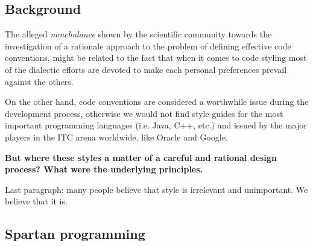 \subsection{Background}

% 

The alleged \emph{nonchalance} shown by the scientific community towards the
investigation of a rationale approach to the problem of defining effective code
conventions, might be related to the fact that when it comes to code styling
most of the dialectic efforts are devoted to make each personal preferences 
prevail against the others.



On the other hand, code conventions are considered a worthwhile issue during
the development process, otherwise we would not find style guides for the most important
programming languages (i.e. Java, C++, etc.) and issued by the major players in
the ITC arena worldwide, like Oracle 
and Google.

\textbf{But where these styles a matter of a careful and rational design process?
What were the underlying principles.}

Last paragraph: many people believe that style is irrelevant and unimportant.
We believe that it is.

\subsection{Spartan programming}

